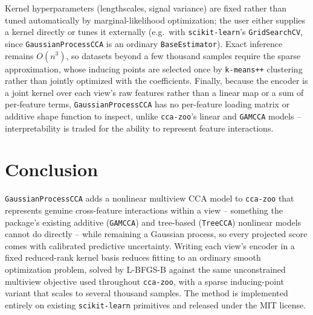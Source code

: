 \documentclass[11pt]{article}
\begin{document}
Kernel hyperparameters (lengthscales, signal variance) are fixed rather than tuned automatically by marginal-likelihood optimization; the user either supplies a kernel directly or tunes it externally (e.g.\ with \texttt{scikit-learn}'s \texttt{GridSearchCV}, since \texttt{GaussianProcessCCA} is an ordinary \texttt{BaseEstimator}). Exact inference remains $O(n^3)$, so datasets beyond a few thousand samples require the sparse approximation, whose inducing points are selected once by \texttt{k-means++} clustering rather than jointly optimized with the coefficients. Finally, because the encoder is a joint kernel over each view's raw features rather than a linear map or a sum of per-feature terms, \texttt{GaussianProcessCCA} has no per-feature loading matrix or additive shape function to inspect, unlike \texttt{cca-zoo}'s linear and \texttt{GAMCCA} models -- interpretability is traded for the ability to represent feature interactions.

\section{Conclusion}

\texttt{GaussianProcessCCA} adds a nonlinear multiview CCA model to \texttt{cca-zoo} that represents genuine cross-feature interactions within a view -- something the package's existing additive (\texttt{GAMCCA}) and tree-based (\texttt{TreeCCA}) nonlinear models cannot do directly -- while remaining a Gaussian process, so every projected score comes with calibrated predictive uncertainty. Writing each view's encoder in a fixed reduced-rank kernel basis reduces fitting to an ordinary smooth optimization problem, solved by L-BFGS-B against the same unconstrained multiview objective used throughout \texttt{cca-zoo}, with a sparse inducing-point variant that scales to several thousand samples. The method is implemented entirely on existing \texttt{scikit-learn} primitives and released under the MIT license.



\end{document}
